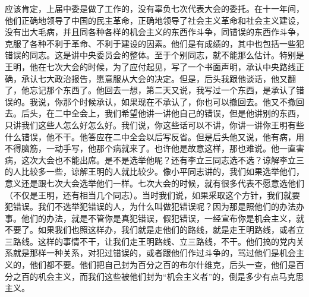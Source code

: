 应该肯定，上届中委是做了工作的，没有辜负七次代表大会的委托。在十一年间，他们正确地领导了中国的民主革命，正确地领导了社会主义革命和社会主义建设，没有出大毛病，并且同各种各样的机会主义的东西作斗争，同错误的东西作斗争，克服了各种不利于革命、不利于建设的因素。他们是有成绩的，其中也包括一些犯错误的同志。这是讲中央委员会的整体。至于个别同志，就不能那么估计。特别是王明，他在七次大会的时候，为了应付起见，写了一个书面声明，承认中央路线正确，承认七大政治报告，愿意服从大会的决定。但是，后头我跟他谈话，他又翻了，他忘记那个东西了。他回去一想，第二天又说，我写过一个东西，是承认了错误的。我说，你那个时候承认，如果现在不承认了，你也可以撤回去。他又不撤回去。后头，在二中全会上，我们希望他讲一讲他自己的错误，但是他讲别的东西，只讲我们这些人怎么好怎么好。我们说，你这些话可以不讲，你讲一讲你王明有些什么错误，他不干。他答应在二中全会以后写反省。但是后头他又说，他有病，用不得脑筋，一动手写，他那个病就来了。也许他是故意这样，那也难说。他一直害病，这次大会也不能出席。是不是选举他呢？还有李立三同志选不选？谅解李立三的人比较多一些，谅解王明的人就比较少。像小平同志讲的，我们如果选举他们，意义还是跟七次大会选举他们一样。七次大会的时候，就有很多代表不愿意选他们（不仅是王明，还有相当几个同志）。当时我们说，如果采取这个方针，我们就要犯错误。我们不选举犯错误的人，为什么叫做犯错误呢？因为那是照他们的办法办事。他们的办法，就是不管你是真犯错误，假犯错误，一经宣布你是机会主义，就不要了。如果我们也照这样办，我们就是走他们的路线，就是走王明路线，或者立三路线。这样的事情不干，让我们走王明路线、立三路线，不干。他们搞的党内关系就是那样一种关系，对犯过错误的，或者跟他们作过斗争的，骂过他们是机会主义的，他们都不要。他们把自己封为百分之百的布尔什维克，后头一查，他们是百分之百的机会主义，而我们这些被他们封为“机会主义者”的，倒是多少有点马克思主义。

